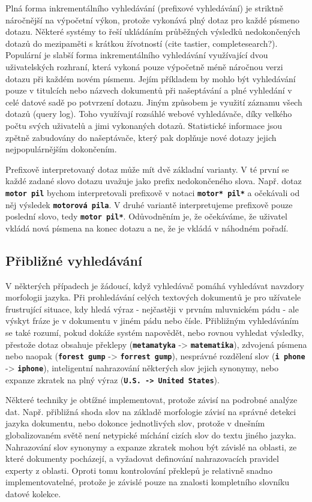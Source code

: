 \documentclass[11pt,letterpaper,oneside,openright]{book}
\newcommand{\bftt}[1]{\texttt{\textbf{#1}}}
\begin{document}
Plná forma inkrementálního vyhledávání (prefixové vyhledávání) je striktně
náročnější na výpočetní výkon, protože vykonává plný dotaz pro každé písmeno
dotazu. Některé systémy to řeší ukládáním průběžných výsledků nedokončených
dotazů do mezipaměti s krátkou žívotností (cite tastier, completesearch?).
Populární je slabší forma inkrementálního vyhledávání využívající dvou
uživatelských rozhraní, která vykoná pouze výpočetně méně náročnou verzi dotazu
při každém novém písmenu.  Jejím příkladem by mohlo být vyhledávání pouze v
titulcích nebo názvech dokumentů při našeptávání a plné vyhledání v celé datové
sadě po potvrzení dotazu.  Jiným způsobem je využití záznamu všech dotazů
(query log). Toho využívají rozsáhlé webové vyhledávače, díky velkého počtu
svých uživatelů a jimi vykonaných dotazů. Statistické informace jsou zpětně
zabudovány do našeptávače, který pak doplňuje nové dotazy jejich
nejpopulárnějším dokončením.

Prefixově interpretovaný dotaz může mít dvě základní varianty. V té první se
každé zadané slovo dotazu uvažuje jako prefix nedokončeného slova. Např. dotaz
\bftt{motor pil} bychom interpretovali prefixově v notaci \bftt{motor* pil*} a
očekávali od něj výsledek \bftt{motorová pila}. V druhé variantě interpretujeme
prefixově pouze poslední slovo, tedy \bftt{motor pil*}. Odůvodněním je, že
očekáváme, že uživatel vkládá nová písmena na konec dotazu a ne, že je vkládá
v náhodném pořadí.

\subsection{Přibližné vyhledávání}
V některých případech je žádoucí, když vyhledávač pomáhá vyhledávat navzdory
morfologii jazyka. Při prohledávání celých textových dokumentů je pro užívatele
frustrující situace, kdy hledá výraz - nejčastěji v prvním mluvnickém pádu -
ale výskyt fráze je v dokumentu v jiném pádu nebo čísle. Přibližným
vyhledáváním se také rozumí, pokud dokáže systém napovědět, nebo rovnou
vyhledat výsledky, přestože dotaz obsahuje překlepy (\bftt{metamatyka} ->
\bftt{matematika}), zdvojená písmena nebo naopak (\bftt{forest gump} ->
\bftt{forrest gump}), nesprávné rozdělení slov (\bftt{i phone} ->
\bftt{iphone}), inteligentní nahrazování některých slov jejich synonymy, nebo
expanze zkratek na plný výraz (\bftt{U.S. -> United States}).

Některé techniky je obtížné implementovat, protože závisí na podrobné analýze
dat. Např. přibližná shoda slov na základě morfologie závisí na správné detekci
jazyka dokumentu, nebo dokonce jednotlivých slov, protože v dnešním
globalizovaném světě není netypické míchání cizích slov do textu jiného jazyka.
Nahrazování slov synonymy a expanze zkratek mohou být závislé na oblasti, ze
které dokumenty pocházejí, a vyžadovat definování nahrazovacích pravidel
experty z oblasti. Oproti tomu kontrolování překlepů je relativně snadno
implementovatelné, protože je závislé pouze na znalosti kompletního slovníku
datové kolekce.
\end{document}
